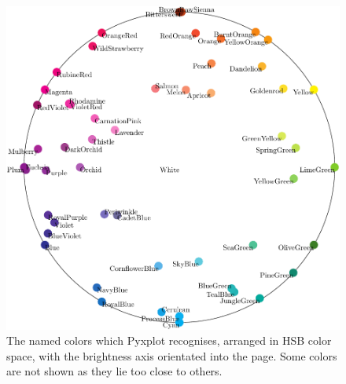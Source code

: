 \begin{figure}
\begin{center}
\includegraphics[width=\textwidth]{figures/pyx_colors}
\end{center}
\caption[The named colors which Pyxplot recognises, arranged in HSB color space]
{The named colors which Pyxplot recognises, arranged in HSB color space, with the brightness axis orientated into the page. Some colors are not shown as they lie too close to others.}
\label{fig:color_table3}
\end{figure}

